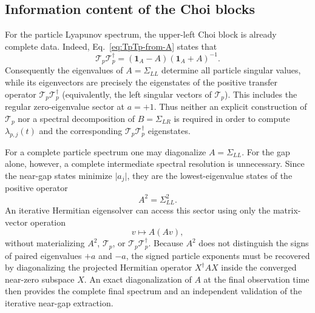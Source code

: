 \documentclass[aps,prb,onecolumn,nofootinbib,superscriptaddress]{revtex4-2}
\newcommand{\I}{\mathbf{1}}
\theoremstyle{plain}
\theoremstyle{definition}
\begin{document}
\subsection{Information content of the Choi blocks}

For the particle Lyapunov spectrum, the upper-left Choi block is already
complete data.  Indeed, Eq.~\eqref{eq:TpTp-from-A} states that
\begin{equation}
  \mathcal T_p\mathcal T_p^\dagger
  =
  (\I_A-A)(\I_A+A)^{-1}.
  \label{eq:TpTpd-eigenstates-from-A}
\end{equation}
Consequently the eigenvalues of \(A=\Sigma_{LL}\) determine all particle
singular values, while its eigenvectors are precisely the eigenstates of
the positive transfer operator \(\mathcal T_p\mathcal T_p^\dagger\)
(equivalently, the left singular vectors of \(\mathcal T_p\)).  This
includes the regular zero-eigenvalue sector at \(a=+1\).  Thus neither an
explicit construction of
\(\mathcal T_p\) nor a spectral decomposition of \(B=\Sigma_{LR}\) is
required in order to compute \(\lambda_{p,j}(t)\) and the corresponding
\(\mathcal T_p\mathcal T_p^\dagger\) eigenstates.

For a complete particle spectrum one may diagonalize \(A=\Sigma_{LL}\).
For the gap alone, however, a complete intermediate spectral resolution is
unnecessary.  Since the near-gap states minimize \(\lvert a_j\rvert\), they
are the lowest-eigenvalue states of the positive operator
\begin{equation}
  A^2=\Sigma_{LL}^2 .
  \label{eq:matrix-free-gap-target}
\end{equation}
An iterative Hermitian eigensolver can access this sector using only the
matrix-vector operation
\begin{equation}
  v\longmapsto A(Av),
  \label{eq:matrix-free-gap-action}
\end{equation}
without materializing \(A^2\), \(\mathcal T_p\), or
\(\mathcal T_p\mathcal T_p^\dagger\).  Because \(A^2\) does not distinguish
the signs of paired eigenvalues \(+a\) and \(-a\), the signed particle
exponents must be recovered by diagonalizing the projected Hermitian
operator \(X^\dagger A X\) inside the converged near-zero subspace \(X\).
An exact diagonalization of \(A\) at the final observation time then provides
the complete final spectrum and an independent validation of the iterative
near-gap extraction.
\end{document}
